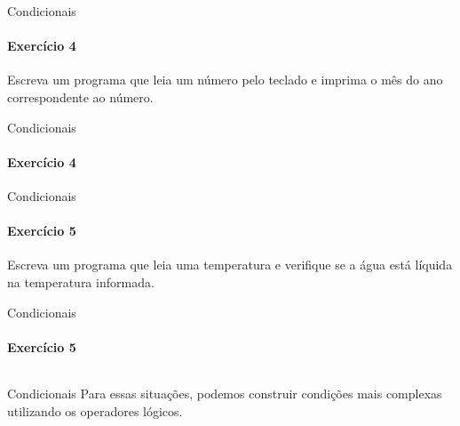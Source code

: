 \documentclass{beamer}
\begin{document}
\begin{frame}{Condicionais}
	\framesubtitle{Exercício 4}
	Escreva um programa que leia um número pelo teclado e imprima o mês do ano correspondente ao número.
\end{frame}
\begin{frame}{Condicionais}
	\framesubtitle{Exercício 4}
\end{frame}
\begin{frame}{Condicionais}
	\framesubtitle{Exercício 5}
	Escreva um programa que leia uma temperatura e verifique se a água está líquida na temperatura informada.
\end{frame}
\begin{frame}{Condicionais}
	\framesubtitle{Exercício 5}
	\inputminted[fontsize=\scriptsize]{c}{resources/ex5.c}
\end{frame}
\begin{frame}{Condicionais}
	Para essas situações, podemos construir condições mais complexas utilizando os \alert{operadores lógicos}.
\end{frame}
\end{document}
